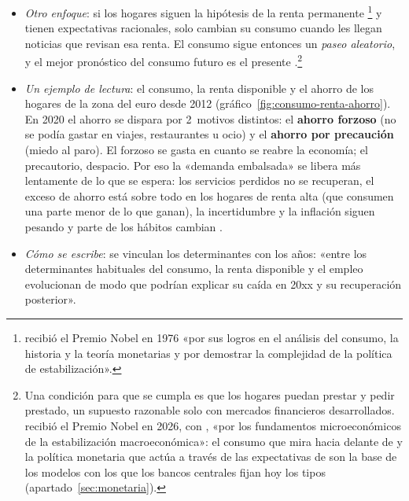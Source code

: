 \documentclass[11pt]{article}
\begin{document}
\begin{itemize}
\begin{itemize}
  \item \emph{Expectativas} ($+$): de crecimiento (pendiente de la curva de tipos), de paro ($-$), confianza de los consumidores y de los gestores de compras (PMI), crecimiento de la economía mundial. Una tasa de ahorro alta frena el consumo, y el índice de miseria de  (inflación más paro) resume 2~frenos.
  \item \emph{Políticas futuras}: si los hogares esperan más impuestos para pagar la deuda que se emite hoy, ahorran más y el estímulo fiscal pierde fuerza (, \textcite{Barro1974}, ); una bajada de tipos anunciada adelanta consumo.
  \end{itemize}
\item \emph{Otro enfoque}: si los hogares siguen la hipótesis de la renta permanente \parencite{Friedman1957}\footnote{ recibió el Premio Nobel en 1976 «por sus logros en el análisis del consumo, la historia y la teoría monetarias y por demostrar la complejidad de la política de estabilización»\nocite{Nobel1976Friedman}.} y tienen expectativas racionales, solo cambian su consumo cuando les llegan noticias que revisan esa renta. El consumo sigue entonces un \emph{paseo aleatorio}, y el mejor pronóstico del consumo futuro es el presente \parencite{Hall1978}.\footnote{Una condición para que se cumpla es que los hogares puedan prestar y pedir prestado, un supuesto razonable solo con mercados financieros desarrollados.  recibió el Premio Nobel en 2026, con , «por los fundamentos microeconómicos de la estabilización macroeconómica»\nocite{Nobel2026Prensa}: el consumo que mira hacia delante de  y la política monetaria que actúa a través de las expectativas de  son la base de los modelos con los que los bancos centrales fijan hoy los tipos (apartado~\ref{sec:monetaria}).}
\item \emph{Un ejemplo de lectura}: el consumo, la renta disponible y el ahorro de los hogares de la zona del euro desde 2012 (gráfico~\ref{fig:consumo-renta-ahorro}). En 2020 el ahorro se dispara por 2~motivos distintos: el \textbf{ahorro forzoso} (no se podía gastar en viajes, restaurantes u ocio) y el \textbf{ahorro por precaución} (miedo al paro). El forzoso se gasta en cuanto se reabre la economía; el precautorio, despacio. Por eso la «demanda embalsada» se libera más lentamente de lo que se espera: los servicios perdidos no se recuperan, el exceso de ahorro está sobre todo en los hogares de renta alta (que consumen una parte menor de lo que ganan), la incertidumbre y la inflación siguen pesando y parte de los hábitos cambian \parencite{Eurostat2026nama10gdp}.
\item \emph{Cómo se escribe}: se vinculan los determinantes con los años: «entre los determinantes habituales del consumo, la renta disponible y el empleo evolucionan de modo que podrían explicar su caída en 20xx y su recuperación posterior».
\end{itemize}
\end{document}
